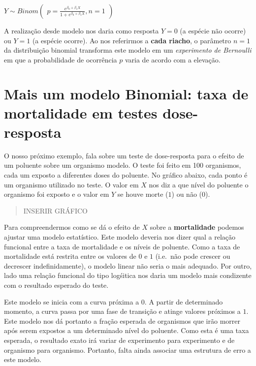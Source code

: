 \documentclass[
]{book}
\begin{document}
\(Y ∼ Binom \left (\begin{array}{c} p = \frac{e^{\beta_0 + \beta_1 X}}{1 + e^{\beta_0 + \beta_1 X}}, n = 1 \end{array}\right)\)

A realização desde modelo nos daria como resposta \(Y = 0\) (a espécie não ocorre) ou \(Y = 1\) (a espécie ocorre). Ao nos referirmos a \textbf{cada riacho}, o parâmetro \(n = 1\) da distribuição binomial transforma este modelo em um \emph{experimento de Bernoulli} em que a probabilidade de ocorrência \(p\) varia de acordo com a elevação.

\hypertarget{mais-um-modelo-binomial-taxa-de-mortalidade-em-testes-dose-resposta}{%
\section{Mais um modelo Binomial: taxa de mortalidade em testes dose-resposta}\label{mais-um-modelo-binomial-taxa-de-mortalidade-em-testes-dose-resposta}}

O nosso próximo exemplo, fala sobre um teste de dose-resposta para o efeito de um poluente sobre um organismo modelo. O teste foi feito em 100 organismos, cada um exposto a diferentes doses do poluente. No gráfico abaixo, cada ponto é um organismo utilizado no teste. O valor em \(X\) nos diz a que nível do poluente o organismo foi exposto e o valor em \(Y\) se houve morte (\(1\)) ou não (\(0\)).

\begin{quote}
INSERIR GRÁFICO
\end{quote}

Para compreendermos como se dá o efeito de \(X\) sobre a \textbf{mortalidade} podemos ajustar uma modelo estatístico. Este modelo deveria nos dizer qual a relação funcional entre a taxa de mortalidade e os níveis de poluente. Como a taxa de mortalidade está restrita entre os valores de \(0\) e \(1\) (i.e.~não pode crescer ou decrescer indefinidamente), o modelo linear não seria o mais adequado. Por outro, lado uma relação funcional do tipo logśitica nos daria um modelo mais condizente com o resultado esperado do teste.

Este modelo se inicia com a curva próxima a \(0\). A partir de determinado momento, a curva passa por uma fase de transição e atinge valores próximos a \(1\). Este modelo nos dá portanto a fração esperada de organismos que irão morrer após serem expostos a um determinado nível do poluente. Como esta é uma taxa esperada, o resultado exato irá variar de experimento para experimento e de organismo para organismo. Portanto, falta ainda associar uma estrutura de erro a este modelo.
\end{document}
